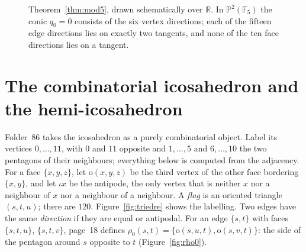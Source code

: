 \documentclass[11pt,a4paper]{amsart}
\theoremstyle{definition}
\theoremstyle{remark}
\newcommand{\F}{\mathbb F}
\newcommand{\R}{\mathbb R}
\begin{document}
\begin{figure}[ht]
\centering
{}
\caption{Theorem~\ref{thm:mod5}, drawn schematically over $\R$. In $\mathbb P^2(\F_5)$ the conic $q_0 = 0$ consists of the six vertex directions; each of the fifteen edge directions lies on exactly two tangents, and none of the ten face directions lies on a tangent.}\label{fig:conic}
\end{figure}

\section{The combinatorial icosahedron and the hemi-icosahedron}\label{sec:comb}

Folder~86 takes the icosahedron as a purely combinatorial object. Label its vertices $0, \dots, 11$, with $0$ and $11$ opposite and $1, \dots, 5$ and $6, \dots, 10$ the two pentagons of their neighbours; everything below is computed from the adjacency. For a face $\{x, y, z\}$, let $\mathrm o(x, y, z)$ be the third vertex of the other face bordering $\{x, y\}$, and let $\iota x$ be the antipode, the only vertex that is neither $x$ nor a neighbour of $x$ nor a neighbour of a neighbour. A \emph{flag} is an oriented triangle $(s, t, u)$; there are $120$. Figure~\ref{fig:triedre} shows the labelling. Two edges have the same \emph{direction} if they are equal or antipodal. For an edge $\{s, t\}$ with faces $\{s, t, u\}$, $\{s, t, v\}$, page~18 defines $\rho_0(s, t) = \{\mathrm o(s, u, t), \mathrm o(s, v, t)\}$: the side of the pentagon around $s$ opposite to $t$ (Figure~\ref{fig:rho0}).
\end{document}
